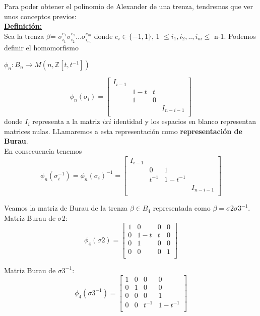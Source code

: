 Para poder obtener el polinomio de Alexander de una trenza, tendremos que ver unos conceptos previos:\\

\textbf{\underline{Definición:}}\\
Sea la trenza $\beta $= $\sigma_{i_{1}}^{e_{1}} \sigma_{i_{2}}^{e_{2}} ... \sigma_{i_{m}}^{e_{m}}$ donde $e_{i} \in \{-1,1\}$, 1 $\le i_{1}, i_{2},..,i_{m} \le$ n-1. Podemos definir el homomorfismo
\begin{center}
	 $ \phi_{n} : B_{n}  \rightarrow  M(n,\mathds{Z}[t,t^{-1}])$	 
\end{center}
\[ \phi_{n} ( \sigma_{i}) = \begin{bmatrix}
I_{i-1} &  &  & \\
 & 1-t & t &  \\
 & 1 & 0 &  \\
 &  &  & I_{n-i-1} \\
\end{bmatrix}\]
donde $ I_{i} $ representa a la matriz $ ixi $ identidad y los espacios en blanco representan matrices nulas. LLamaremos a esta representación como \textbf{representación de Burau}.\\

En consecuencia tenemos 
	\[ \phi_{n} ( \sigma_{i}^{-1}) = \phi_{n} ( \sigma_{i})^{-1}= \begin{bmatrix}
	I_{i-1} &  &  & \\
	& 0 & 1 &  \\
	& t^{-1} & 1-t^{-1} &  \\	
	&  &  & I_{n-i-1} \\
	\end{bmatrix}\]


\bigskip
Veamos la matriz de Burau de la trenza $\beta \in B_{4}$ representada como $\beta = \sigma2\sigma3^{-1}$.\\
Matriz Burau de $ \sigma2 $:
	\[ \phi_{4} ( \sigma2) = \begin{bmatrix}
	1 & 0 & 0 & 0 \\
	0 & 1-t & t & 0  \\
	0 & 1 & 0 & 0 \\
	0 & 0 & 0 & 1 \\
	\end{bmatrix}\]

Matriz Burau de $ \sigma3^{-1} $:
\[ \phi_{4} ( \sigma3^{-1}) = \begin{bmatrix}
	1 & 0 & 0 & 0 \\
	0 & 1 & 0 & 0 \\
	0 & 0 & 0 & 1  \\	
	0 & 0 & t^{-1} & 1-t^{-1} \\
\end{bmatrix}\]
 
